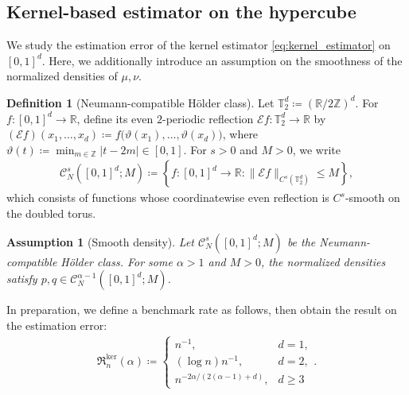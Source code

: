 \documentclass[11pt,reqno]{amsart}
\newtheorem{assumption}{Assumption}
\theoremstyle{definition}
\newtheorem{definition}{Definition}
\begin{document}
\subsection{Kernel-based estimator on the hypercube}

We study the estimation error of the kernel estimator \eqref{eq:kernel_estimator} on $[0,1]^d$. Here, we additionally introduce an assumption on the smoothness of the normalized densities of $\mu,\nu$.
\begin{definition}[Neumann-compatible H\"older class]
\label{def:neumann_holder_class}
Let $\mathbb{T}_2^d \coloneqq (\mathbb{R}/2\mathbb{Z})^d$. For $f:[0,1]^d \to \mathbb{R}$, define its even $2$-periodic reflection $\mathcal{E}f: \mathbb{T}_2^d \to \mathbb{R}$ by
$
    (\mathcal{E}f)(x_1,\dots,x_d)
    \coloneqq
    f\bigl(\vartheta(x_1),\dots,\vartheta(x_d)\bigr)
$, where $\vartheta(t)
    \coloneqq
    \min_{m\in\mathbb{Z}} |t-2m| \in [0,1]
$.
For $s>0$ and $M>0$, we write
\begin{align}
    \mathcal{C}_N^s([0,1]^d;M)
    \coloneqq
    \left\{
        f:[0,1]^d\to\mathbb{R}:
        \|\mathcal{E}f\|_{C^s(\mathbb{T}_2^d)} \le M
    \right\},
\end{align}
which consists of functions whose coordinatewise even reflection is $C^s$-smooth on the doubled torus. 
\end{definition}
\begin{assumption}[Smooth density]
\label{assm:cube_kernel_smoothness}
Let $\mathcal{C}_N^s([0,1]^d;M)$ be the Neumann-compatible H\"older class.
For some $\alpha>1$ and $M>0$, the normalized densities satisfy $p,q \in \mathcal{C}_N^{\alpha-1}([0,1]^d;M)$.
\end{assumption}
In preparation, we define a benchmark rate as follows, then obtain the result on the estimation error:
\begin{align}
    \mathfrak R_n^{\mathrm{ker}}(\alpha)
    \coloneqq
    \begin{cases}
        n^{-1}, & d=1,\\
        (\log n)n^{-1}, & d=2,\\
        n^{-{2\alpha} / ({2(\alpha-1)+d})}, & d\ge 3
    \end{cases}.
\end{align}
\end{document}
